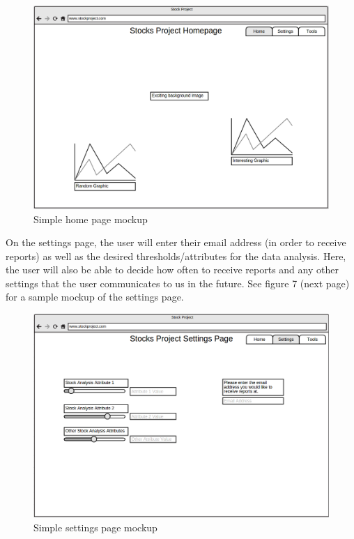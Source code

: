 \documentclass[12pt,a4paper]{article}
\begin{document}
\begin{figure}[h!]
  \centering
  \includegraphics[scale=0.3]{homepage.png}
  \caption{Simple home page mockup}
\end{figure}

On the settings page, the user will enter their email address (in order to receive reports) as well as the desired thresholds/attributes for the data analysis. Here, the user will also be able to decide how often to receive reports and any other settings that the user communicates to us in the future. See figure 7 (next page) for a sample mockup of the settings page.

\begin{figure}[h!]
  \centering
  \includegraphics[scale=0.3]{settingspage.png}
  \caption{Simple settings page mockup}
\end{figure}
\end{document}
